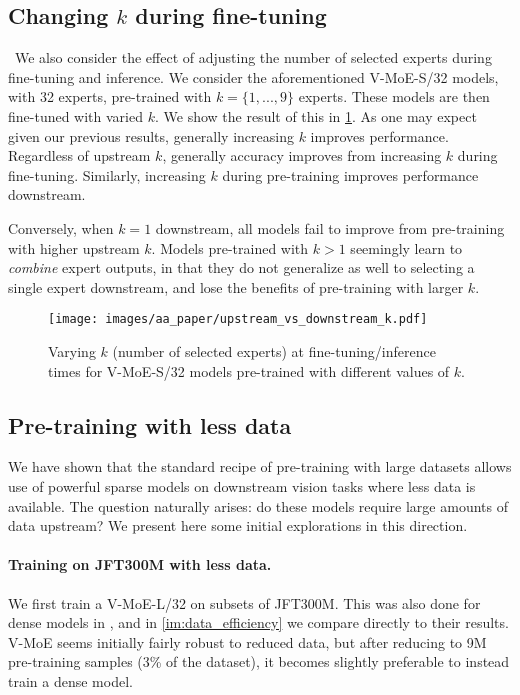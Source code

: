 \documentclass{article}
\newcommand{\abbv}{{V-MoE}}
\begin{document}
\subsection{Changing \texorpdfstring{$k$}{k} during fine-tuning}\
We also consider the effect of adjusting the number of selected experts during fine-tuning and inference. We consider the aforementioned \abbv{}-S/32 models, with 32 experts, pre-trained with $k = \{1, ..., 9\}$ experts. These models are then fine-tuned with varied $k$. We show the result of this in \cref{im:vary_k_finetuning}.
As one may expect given our previous results, generally increasing $k$ improves performance. Regardless of upstream $k$, generally accuracy improves from increasing $k$ during fine-tuning. Similarly, increasing $k$ during pre-training improves performance downstream.

Conversely, when $k = 1$ downstream, all models fail to improve from pre-training with higher upstream $k$. Models pre-trained with $k>1$ seemingly learn to \textit{combine} expert outputs, in that they do not generalize as well to selecting a single expert downstream, and lose the benefits of pre-training with larger $k$.

\begin{figure}[h]
\centering
\texttt{[image: images/aa\_paper/upstream\_vs\_downstream\_k.pdf]}
\caption{Varying $k$ (number of selected experts) at fine-tuning/inference times for \abbv{}-S/32 models pre-trained with different values of $k$.}
\label{im:vary_k_finetuning}
\end{figure}















\subsection{Pre-training with less data}
We have shown that the standard recipe of pre-training with large datasets allows use of powerful sparse models on downstream vision tasks where less data is available. The question naturally arises: do these models require large amounts of data upstream?
We present here some initial explorations in this direction.
\paragraph{Training on JFT300M with less data.}
We first train a \abbv{}-L/32 on subsets of JFT300M. This was also done for dense models in \cite{dosovitskiy2020image}, and in \cref{im:data_efficiency} we compare directly to their results. \abbv{} seems initially fairly robust to reduced data, but after reducing to 9M pre-training samples (3\% of the dataset), it becomes slightly preferable to instead train a dense model.
\end{document}

